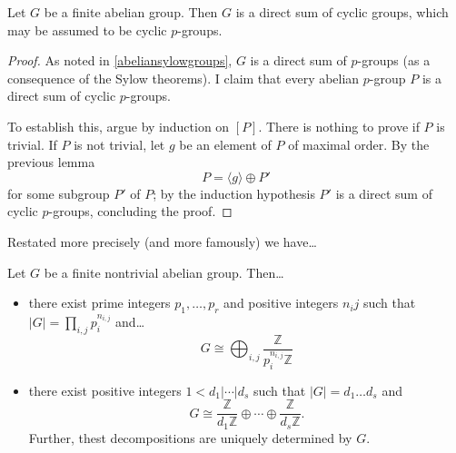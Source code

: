 \begin{corollary}
Let $G$ be a finite abelian group. Then $G$ is a direct sum of cyclic groups, which may be assumed to be cyclic $p$-groups.
\end{corollary}

\begin{proof}
As noted in \ref{abeliansylowgroups}, $G$ is a direct sum of $p$-groups (as a consequence of the Sylow theorems). I claim that every abelian $p$-group $P$ is a direct sum of cyclic $p$-groups.

To establish this, argue by induction on $[P]$. There is nothing to prove if $P$ is trivial. If $P$ is not trivial, let $g$ be an element of $P$ of maximal order. By the previous lemma
$$P =\langle g \rangle \oplus P'$$
for some subgroup $P'$ of $P$; by the induction hypothesis $P'$ is a direct sum of cyclic $p$-groups, concluding the proof.
\end{proof}

\noindent Restated more precisely (and more famously) we have\dots

\begin{theorem}
\label{finiteabelianclassificationtheorem}
Let $G$ be a finite nontrivial abelian group. Then\dots
\begin{itemize}
  \item there exist prime integers $p_1, \dots, p_r$ and positive integers $n_ij$ such that $|G| = \prod_{i,j} p_i^{n_{i,j}}$ and\dots
  $$G \cong \bigoplus_{i,j} \frac{\mathbb{Z}}{p_i^{n_{i,j}}\mathbb{Z}}$$
  \item there exist positive integers $1 < d_1 | \cdots | d_s$ such that $|G| = d_1 \dots d_s$ and
  $$G \cong \frac{\mathbb{Z}}{d_1\mathbb{Z}}\oplus \cdots \oplus \frac{\mathbb{Z}}{d_s\mathbb{Z}}.$$
  Further, thest decompositions are uniquely determined by $G$.
\end{itemize}
\end{theorem}